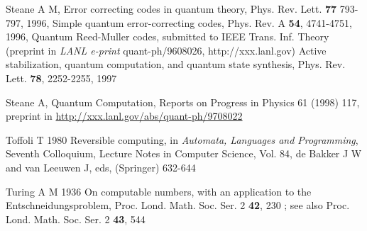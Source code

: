 \documentclass{article}
\begin{document}
\begin{thebibliography}{12}
Steane A M,
Error correcting codes in quantum theory,
Phys. Rev. Lett. {\bf 77} 793-797, 1996,
Simple quantum error-correcting codes,
Phys. Rev. A {\bf 54}, 4741-4751, 1996,
Quantum Reed-Muller codes,
submitted to IEEE Trans. Inf. Theory (preprint in {\it LANL e-print} quant-ph/9608026, 
 http://xxx.lanl.gov)
Active stabilization, quantum computation, and quantum state synthesis,
Phys. Rev. Lett. {\bf 78}, 2252-2255, 1997

Steane A,
Quantum Computation, Reports on Progress in Physics 61 (1998) 117, preprint in 
\hyperref{http://xxx.lanl.gov/abs/quant-ph/9708022}{}{}
{http://xxx.lanl.gov/abs/quant-ph/9708022}

% 
% 
% 
% 
% 
% 
% 
% 

Toffoli T 1980
Reversible computing,
in {\em Automata, Languages and Programming}, Seventh Colloquium,
Lecture Notes in Computer Science, Vol. 84, de Bakker J W and
van Leeuwen J, eds, (Springer) 632-644





Turing A M 1936
On computable numbers, with an application to the
Entschneidungsproblem,
Proc. Lond. Math. Soc. Ser. 2 {\bf 42}, 230 ; see also
Proc. Lond. Math. Soc. Ser. 2 {\bf 43}, 544 



\end{thebibliography}
\end{document}
